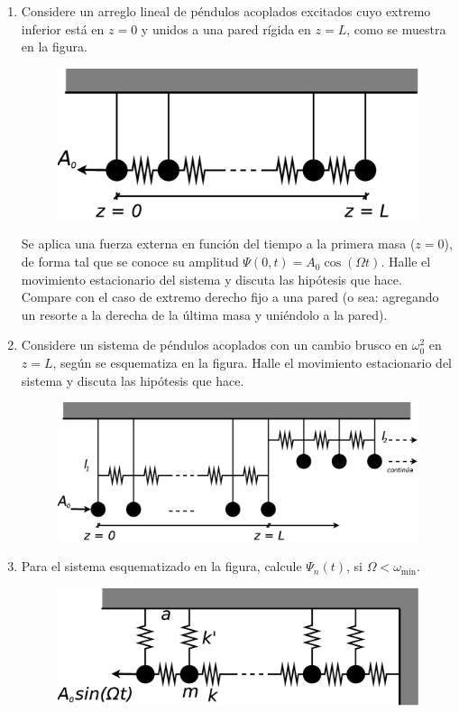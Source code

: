 \documentclass[11pt,spanish,a4paper]{article}
\begin{document}
\begin{enumerate}
\item Considere un arreglo lineal de péndulos acoplados excitados cuyo extremo inferior está en $z= 0$ y unidos a una pared rígida en $z= L$, como se muestra en la figura.
\begin{figure}[H]
	\centering{}\includegraphics[clip,scale=0.25]{ej1-15}
\end{figure}
Se aplica una fuerza externa en función del tiempo a la primera masa ($z=0$), de forma tal que se conoce su amplitud $\Psi(0,t)= A_0 \cos(\Omega t)$.
Halle el movimiento estacionario del sistema y discuta las hipótesis que hace.
Compare con el caso de extremo derecho fijo a una pared (o sea: agregando un resorte a la derecha de la última masa y uniéndolo a la pared). 



\item Considere un sistema de péndulos acoplados con un cambio brusco en $\omega_{0}^{2}$ en $z=L$, según se esquematiza en la figura.
Halle el movimiento estacionario del sistema y discuta las hipótesis que hace.
\begin{figure}[H]
	\centering{}\includegraphics[clip,scale=0.25]{ej1-16}
\end{figure}



\item Para el sistema esquematizado en la figura, calcule $\Psi_{n}(t)$, si $\Omega<\omega_\textrm{mín}$.
\begin{figure}[H]
	\centering{}\includegraphics[clip,scale=0.25]{ej1-17}
\end{figure}




\end{enumerate}
\end{document}
